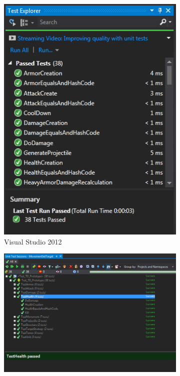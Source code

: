 \begin{figure}[t]
\centering
	\begin{subfigure}[b]{0.45\textwidth}
	\centering
	\captionsetup{justification=centering}
	\includegraphics[width=\textwidth]{./images/Kapitel_Einleitung/VisualStudioTestExplorer}
	\caption{Visual Studio 2012}
	\label{fig:VisualStudioTestExplorer}
	\end{subfigure}
	\begin{subfigure}[b]{0.8\textwidth}
	\centering
	\captionsetup{justification=centering}
	\includegraphics[width=\textwidth]{./images/Kapitel_Einleitung/ResharperTestExplorer}

\end{subfigure}
\end{figure}
